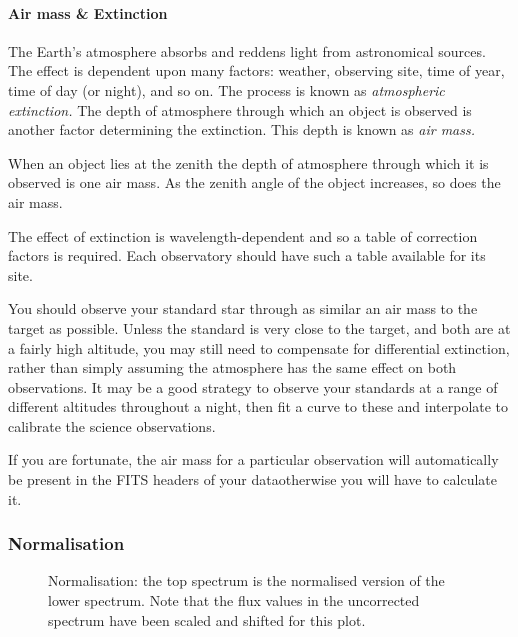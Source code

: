 \paragraph{Air mass \& Extinction}

The Earth's atmosphere absorbs and reddens light from astronomical sources.
The effect is dependent upon many factors: weather, observing site, time of
year, time of day (or night), and so on.
The process is known as {\sl atmospheric extinction.}
The depth of atmosphere through which an object is
observed is another factor determining the extinction.
This depth is known as {\sl air mass.}

When an object lies at the zenith the depth of atmosphere
through which it is observed is one air mass.
As the zenith angle of the object increases, so does the air mass.

The effect of extinction is wavelength-dependent and so a table of
correction factors is required.
Each observatory should have such a table available for its site.

You should observe your standard star through as similar an air mass
to the target as possible.  Unless the standard is very close to the
target, and both are at a fairly high altitude, you may still need to
compensate for differential extinction, rather than simply assuming the
atmosphere has the same effect on both observations.  It may be a good
strategy to observe your standards at a range of different altitudes
throughout a night, then fit a curve to these and interpolate to
calibrate the science observations.

If you are fortunate, the air mass for a particular observation will
automatically be present in the FITS headers of your
data\scspec{---}{ - }otherwise you will have to calculate it.


\subsubsection{Normalisation}

\begin{figure}
\begin{center}
{\leavevmode\epsfysize=136mm}

\parbox{140mm}{
\caption{Normalisation: the top spectrum is the normalised version of the
lower spectrum.  Note that the flux values in the uncorrected spectrum have
been scaled and shifted for this plot.}
\label{fi_normalise}
}
\end{center}
\end{figure}

